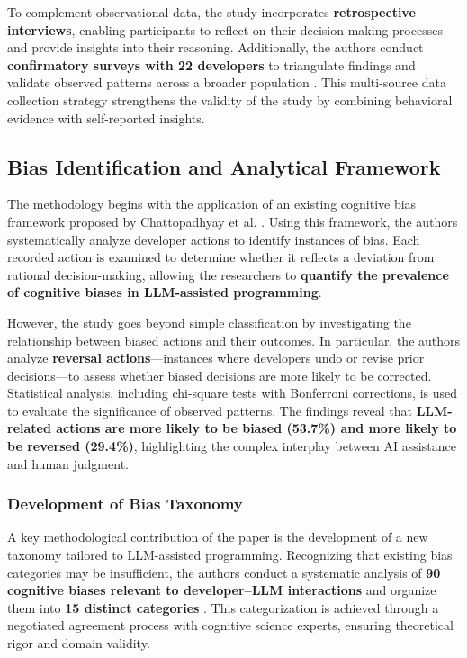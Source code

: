 To complement observational data, the study incorporates \textbf{retrospective interviews}, enabling participants to reflect on their decision-making processes and provide insights into their reasoning. Additionally, the authors conduct \textbf{confirmatory surveys with 22 developers} to triangulate findings and validate observed patterns across a broader population . This multi-source data collection strategy strengthens the validity of the study by combining behavioral evidence with self-reported insights.

\subsection{Bias Identification and Analytical Framework}
The methodology begins with the application of an existing cognitive bias framework proposed by Chattopadhyay et al. \cite{chattopadhyay2020cognitive}. Using this framework, the authors systematically analyze developer actions to identify instances of bias. Each recorded action is examined to determine whether it reflects a deviation from rational decision-making, allowing the researchers to \textbf{quantify the prevalence of cognitive biases in LLM-assisted programming}.

However, the study goes beyond simple classification by investigating the relationship between biased actions and their outcomes. In particular, the authors analyze \textbf{reversal actions}—instances where developers undo or revise prior decisions—to assess whether biased decisions are more likely to be corrected. Statistical analysis, including chi-square tests with Bonferroni corrections, is used to evaluate the significance of observed patterns. The findings reveal that \textbf{LLM-related actions are more likely to be biased (53.7\%) and more likely to be reversed (29.4\%)}, highlighting the complex interplay between AI assistance and human judgment.

\subsubsection{Development of Bias Taxonomy}
A key methodological contribution of the paper is the development of a new taxonomy tailored to LLM-assisted programming. Recognizing that existing bias categories may be insufficient, the authors conduct a systematic analysis of \textbf{90 cognitive biases relevant to developer–LLM interactions} and organize them into \textbf{15 distinct categories} . This categorization is achieved through a negotiated agreement process with cognitive science experts, ensuring theoretical rigor and domain validity.


